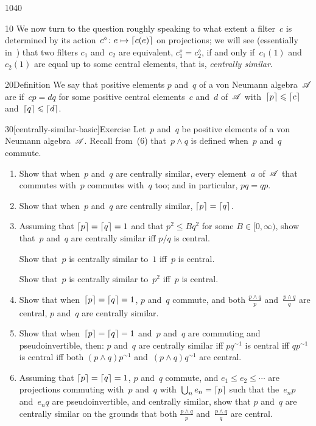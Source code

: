 \begin{parsec}{1040}%
\begin{point}{10}%
We now turn 
	to the question
	roughly speaking 
to what extent a filter~$c$ is determined by
its action~$c^\diamond\colon e\mapsto \left\lceil c(e)\right\rceil$ on projections;
we will see (essentially in~)
that two filters $c_1$ and~$c_2$
are equivalent, $c_1^\diamond = c_2^\diamond$,
if and only if~$c_1(1)$ and~$c_2(1)$
are equal up to some central elements,
that is, \emph{centrally similar}.
\end{point}
\begin{point}{20}{Definition}%
We say that positive elements $p$ and~$q$ of a von Neumann algebra~$\mathscr{A}$
are 
if~$cp=dq$ for some positive central elements~$c$ and~$d$ of~$\mathscr{A}$
with~$\left\lceil p\right\rceil\leqslant \left\lceil c\right\rceil$
and~$\left\lceil q\right\rceil\leqslant \left\lceil d\right\rceil$.
\end{point}
\begin{point}{30}[centrally-similar-basic]{Exercise}%
Let~$p$ and~$q$ be positive elements
of a von Neumann algebra~$\mathscr{A}$.
Recall from~(6)
that~$p\wedge q$ is defined when~$p$ and~$q$ commute.
\begin{enumerate}
\item
Show that when~$p$ and~$q$ are centrally similar,
every element~$a$ of~$\mathscr{A}$ that commutes
with~$p$ commutes with~$q$ too;
and in particular, $pq=qp$.
\item
Show that when~$p$ and~$q$ are centrally similar,
$\left\lceil p\right\rceil=\left\lceil q\right\rceil$.
\item[2a.]
Assuming that $\left\lceil p\right\rceil=\left\lceil q\right\rceil=1$
and that $p^2\leq Bq^2$ for some $B\in [0,\infty)$,
show that~$p$ and~$q$ are centrally similar iff $p/q$ is central.

Show that~$p$ is centrally similar to~$1$ iff~$p$ is central.

Show that~$p$ is centrally similar to~$p^2$ iff~$p$ is central.
\item
Show that when~$\left\lceil p\right\rceil=\left\lceil q\right\rceil=1$,
$p$ and~$q$ commute,
and both $\frac{p\wedge q}{p}$ 
and~$\frac{p\wedge q}{q}$
are central,
$p$ and~$q$ are centrally similar.
\item
Show that when~$\left\lceil p\right\rceil=\left\lceil q\right\rceil=1$
and~$p$ and~$q$ are commuting and pseudoinvertible,
then:
$p$ and~$q$ are centrally similar iff
$pq^{\sim 1}$ is central
iff $qp^{\sim 1}$ is central
iff both $(p\wedge q)p^{\sim 1}$
and~$(p\wedge q)q^{\sim 1}$ are central.
\item
Assuming that $\left\lceil p\right\rceil=\left\lceil q\right\rceil=1$,
$p$ and~$q$ commute,
and $e_1 \leq e_2 \leq \dotsb$
are projections commuting with~$p$ and~$q$
with~$\bigcup_n e_n=\left\lceil p\right\rceil$
such that the~$e_np$ and~$e_nq$
are pseudoinvertible,
and centrally similar,
show that $p$ and~$q$ are centrally similar
on the 
grounds that both  $\frac{p\wedge q}{p}$
and~$\frac{p\wedge q}{q}$ are central.


\end{enumerate}
\end{point}
\end{parsec}

